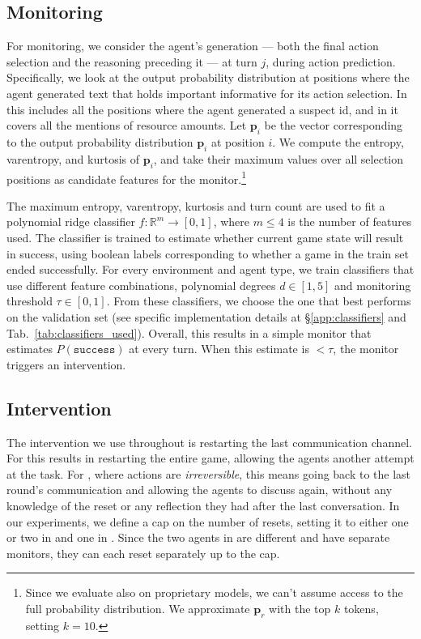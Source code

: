 \subsection{Monitoring}
For monitoring, we consider the agent's generation --- both the final action selection and the reasoning preceding it --- at turn $j$, during action prediction. Specifically, we look at the output probability distribution at positions where the agent generated text that holds important informative for its action selection. In \ourenv{} this includes all the positions where the agent generated a suspect id, and in \govsim{} it covers all the mentions of resource amounts. 
Let $\mathbf{p}_i$ be the vector corresponding to the output probability distribution $\mathbf{p}_i$  at position $i$.
We compute the entropy, varentropy, and kurtosis of $\mathbf{p}_i$, and take their maximum values over all selection positions as candidate features for the monitor.\footnote{Since we evaluate also on proprietary models, we can't assume access to the full probability distribution. We approximate $\mathbf{p}_r$ with the top $k$ tokens, setting $k=10$.}

The maximum entropy, varentropy, kurtosis and turn count are used to fit a polynomial ridge classifier $f: \mathbb{R}^m \rightarrow [0,1]$, where $m\leq4$ is the number of features used.
The classifier is trained to estimate whether current game state will result in success, using boolean labels corresponding to whether a game in the train set ended successfully. For every environment and agent type, we train classifiers that use different feature combinations, polynomial degrees $d\in[1,5]$ and monitoring threshold $\tau\in[0,1]$. From these classifiers, we choose the one that best performs on the validation set (see specific implementation details at \S\ref{app:classifiers} and Tab.~\ref{tab:classifiers_used}). Overall, this results in a simple monitor that estimates $P(\texttt{success})$ at every turn. When this estimate is $<\tau$, the monitor triggers an intervention.


\subsection{Intervention}
The intervention we use throughout is restarting the last communication channel. For \ourenv{} this results in restarting the entire game, allowing the agents another attempt at the task. For \govsim{}, where actions are \emph{irreversible}, this means going back to the last round's communication and allowing the agents to discuss again, without any knowledge of the reset or any reflection they had after the last conversation. In our experiments, we define a cap on the number of resets, setting it to either one or two in \ourenv{} and one in \govsim{}. Since the two agents in \ourenvasym{} are different and have separate monitors, they can each reset separately up to the cap.


